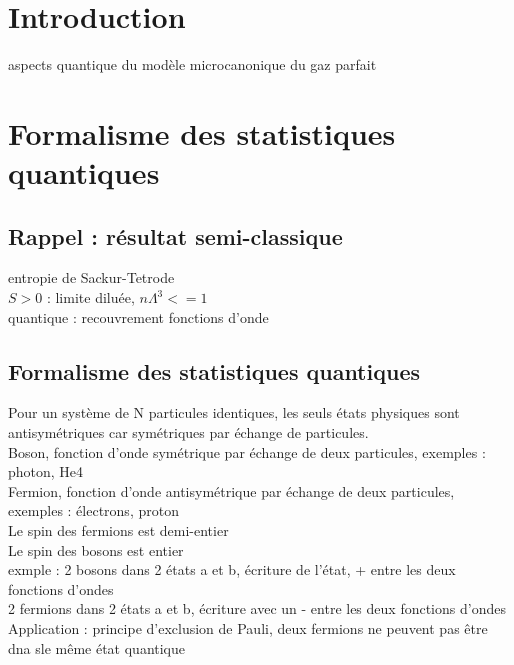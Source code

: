 


\biblio{}

\section*{Introduction}
aspects quantique du modèle microcanonique du gaz parfait \\


\section{Formalisme des statistiques quantiques}
\subsection{Rappel : résultat semi-classique}
entropie de Sackur-Tetrode \\
$S>0$ : limite diluée, $n\Lambda^3 <= 1$ \\
quantique : recouvrement fonctions d'onde \\

\subsection{Formalisme des statistiques quantiques}
Pour un système de N particules identiques, les seuls états physiques sont antisymétriques car symétriques par échange de particules.  \\
Boson, fonction d'onde symétrique par échange de deux particules, exemples : photon, He4 \\
Fermion, fonction d'onde antisymétrique par échange de deux particules, exemples : électrons, proton \\
Le spin des fermions est demi-entier \\
Le spin des bosons est entier \\
exmple : 2 bosons dans 2 états a et b, écriture de l'état, + entre les deux fonctions d'ondes  \\
2 fermions dans 2 états a et b, écriture avec un - entre les deux fonctions d'ondes \\
Application : principe d'exclusion de Pauli, deux fermions ne peuvent pas être dna sle même état quantique \\

